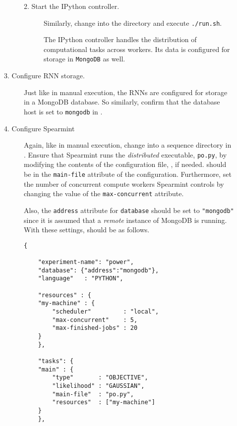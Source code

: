 \begin{description}
\begin{description}
\begin{description}
  \item[2. Start the \textsf{IPython} controller.] \hfill

    Similarly, change into the  directory and execute \texttt{./run.sh}.

    The \textsf{IPython} controller handles the distribution of computational tasks across workers.
    Its data is configured for storage in \texttt{MongoDB} as well.

  \end{description}


\item[3. Configure RNN storage.] \hfill
  
  Just like in manual execution, the RNNs are configured for storage in a \textsf{MongoDB} database.
  So similarly, confirm that the database host is set to \texttt{mongodb} in .


\item[4. Configure \textsf{Spearmint}] \hfill
    
  Again, like in manual execution, change into a sequence directory in .
  Ensure that \textsf{Spearmint} runs the \emph{distributed} executable, \texttt{po.py}, by modifying the contents of the configuration file, , if needed.
     should be in the \texttt{main-file} attribute of the configuration.
    Furthermore, set the number of concurrent compute workers \textsf{Spearmint} controls by changing the value of the \texttt{max-concurrent} attribute.


    Also, the \texttt{address} attribute for \texttt{database} should be set to \texttt{"mongodb"} since it is assumed that a \emph{remote} instance of \textsf{MongoDB} is running.
    With these settings,  should be as follows.

\begin{verbatim}
{

    "experiment-name": "power",
    "database": {"address":"mongodb"},
    "language"   : "PYTHON",
    
    "resources" : {
	"my-machine" : {
	    "scheduler"         : "local",
	    "max-concurrent"    : 5,
	    "max-finished-jobs" : 20
	}
    },

    "tasks": {
	"main" : {
	    "type"       : "OBJECTIVE",
	    "likelihood" : "GAUSSIAN",
	    "main-file"  : "po.py",
	    "resources"  : ["my-machine"]
	}
    },
    

\end{verbatim}
\end{description}
\end{description}
